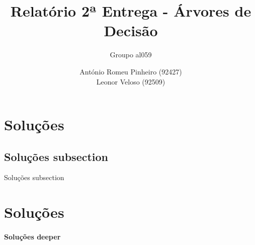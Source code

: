 \documentclass{article}
\title{Relatório 2ª Entrega - Árvores de Decisão}
\author{Groupo al059 \and António Romeu Pinheiro (92427)\\Leonor Veloso (92509)}
\begin{document}
\maketitle

{\section{Soluções}
\subsection{Soluções subsection}
Soluções subsection}
\section{Soluções}
\paragraph{Soluções deeper}
\end{document}
